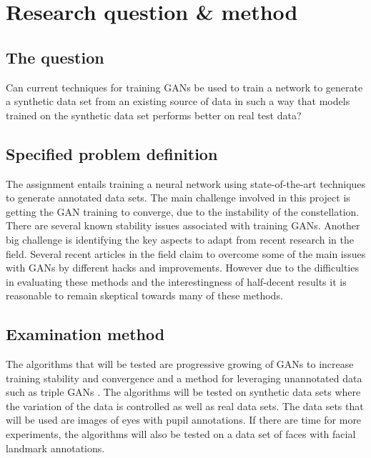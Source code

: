 \documentclass[a4paper]{article}
\begin{document}
\section{Research question \& method}
\subsection{The question}
Can current techniques for training GANs be used to train a network to generate a synthetic data set from
an existing source of data in such a way that models trained on the synthetic
data set  performs better  on real test data?

\subsection{Specified problem definition}
The assignment entails training a neural network using state-of-the-art
techniques to generate annotated data sets. The main challenge involved in this
project is getting the GAN training to converge, due to the instability of the
constellation. There are several known stability issues associated with training
GANs. Another big challenge is identifying the key aspects to adapt from recent
research in the field. Several recent articles in the field claim to overcome
some of the main issues with GANs by different  hacks and improvements.
However due to the difficulties in evaluating these methods and the
 interestingness of half-decent results it
is reasonable to remain  skeptical towards many of these
methods.

\subsection{Examination method}
The algorithms that will be tested are  progressive growing of GANs
\cite{karras2017progressive} to increase training stability and convergence and
a method for leveraging unannotated data such as triple GANs
\cite{li2017triple}. The algorithms will be tested on synthetic data sets where
the variation of the data is controlled as well as real data sets. The data sets
that will be used are images of eyes with pupil annotations. If there are time
for more experiments, the algorithms will also be tested on a data set of faces
with facial landmark annotations. 
\end{document}

